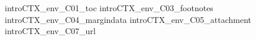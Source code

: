               
\environment  introCTX_env_C01_toc                           
\environment  introCTX_env_C03_footnotes                     
\environment  introCTX_env_C04_margindata                    
\environment  introCTX_env_C05_attachment                    
\environment  introCTX_env_C07_url                        

\stopenvironment
